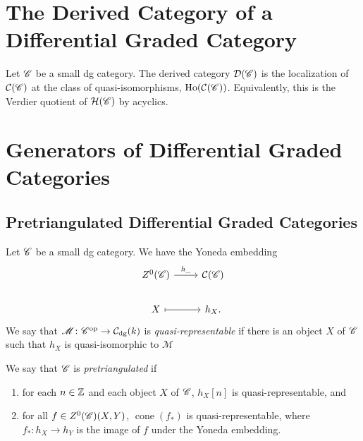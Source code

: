 \documentclass[dissertation.tex]{subfiles}
\begin{document}

\section{The Derived Category of a Differential Graded Category}

\begin{defn}
  Let $\mathscr{C}$ be a small dg category.
  The derived category $\mathcal{D}(\mathscr{C})$ is the localization of $\mathcal{C}(\mathscr{C})$ at the class of quasi-isomorphisms, $\operatorname{Ho}(\mathcal{C}(\mathscr{C}))$.
  Equivalently, this is the Verdier quotient of $\mathcal{H}(\mathscr{C})$ by acyclics.
\end{defn}

\section{Generators of Differential Graded Categories}
\subsection{Pretriangulated Differential Graded Categories}

\begin{defn}
  Let $\mathscr{C}$ be a small dg category.
  We have the Yoneda embedding 
  $$\begin{tikzcd}
    Z^0(\CC) \arrow{r}{h_{\_}} & \mathcal{C}(\CC)\\
    X \arrow[mapsto]{r} & h_X.
  \end{tikzcd}$$
  We say that $\mathscr{M} \colon \mathscr{C}^\text{op} \rightarrow \mathcal{C}_\text{dg}(k)$ is {\it quasi-representable} if there is an object $X$ of $\mathscr{C}$ such that $h_X$ is quasi-isomorphic to $\mathscr{M}$
  
  We say that $\mathscr{C}$ is {\it pretriangulated} if
  \begin{enumerate}
  \item
    for each $n \in \mathbb{Z}$ and each object $X$ of $\mathscr{C}$, $h_X[n]$ is quasi-representable, and
  \item
    for all $f \in Z^0(\mathscr{C})(X,Y)$, $\operatorname{cone}(f_*)$ is quasi-representable, where $f_* : h_X \rightarrow h_Y$ is the image of $f$ under the Yoneda embedding.
  \end{enumerate}
\end{defn}
\end{document}
